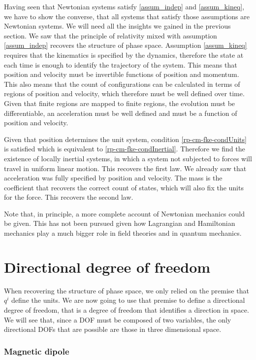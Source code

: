 Having seen that Newtonian systems satisfy \ref{assum_indep} and \ref{assum_kineq}, we have to show the converse, that all systems that satisfy those assumptions are Newtonian systems. We will need all the insights we gained in the previous section. We saw that the principle of relativity mixed with assumption \ref{assum_indep} recovers the structure of phase space. Assumption \ref{assum_kineq} requires that the kinematics is specified by the dynamics, therefore the state at each time is enough to identify the trajectory of the system. This means that position and velocity must be invertible functions of position and momentum. This also means that the count of configurations can be calculated in terms of regions of position and velocity, which therefore must be well defined over time. Given that finite regions are mapped to finite regions, the evolution must be differentiable, an acceleration must be well defined and must be a function of position and velocity.

Given that position determines the unit system, condition \ref{rp-cm-fke-condUnits} is satisfied which is equivalent to \ref{rp-cm-fke-condInertial}. Therefore we find the existence of locally inertial systems, in which a system not subjected to forces will travel in uniform linear motion. This recovers the first law. We already saw that acceleration was fully specified by position and velocity. The mass is the coefficient that recovers the correct count of states, which will also fix the units for the force. This recovers the second law.

Note that, in principle, a more complete account of Newtonian mechanics could be given. This has not been pursued given how Lagrangian and Hamiltonian mechanics play a much bigger role in field theories and in quantum mechanics.

\section{Directional degree of freedom}

When recovering the structure of phase space, we only relied on the premise that $q^i$ define the units. We are now going to use that premise to define a directional degree of freedom, that is a degree of freedom that identifies a direction in space. We will see that, since a DOF must be composed of two variables, the only directional DOFs that are possible are those in three dimensional space.

\subsubsection{Magnetic dipole}

